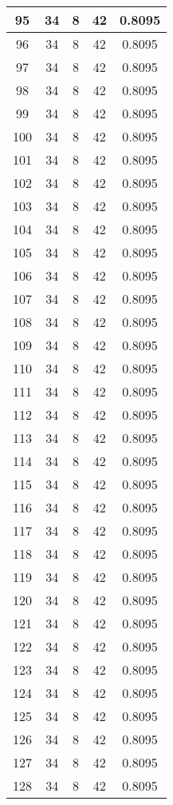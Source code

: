 \documentclass[letterpaper, 12pt]{article}
\begin{document}
\begin{longtable}{|c|c|c|c|c|}
\hline
95 & 34 & 8 & 42 & 0.8095 \\
\hline
96 & 34 & 8 & 42 & 0.8095 \\
\hline
97 & 34 & 8 & 42 & 0.8095 \\
\hline
98 & 34 & 8 & 42 & 0.8095 \\
\hline
99 & 34 & 8 & 42 & 0.8095 \\
\hline
100 & 34 & 8 & 42 & 0.8095 \\
\hline
101 & 34 & 8 & 42 & 0.8095 \\
\hline
102 & 34 & 8 & 42 & 0.8095 \\
\hline
103 & 34 & 8 & 42 & 0.8095 \\
\hline
104 & 34 & 8 & 42 & 0.8095 \\
\hline
105 & 34 & 8 & 42 & 0.8095 \\
\hline
106 & 34 & 8 & 42 & 0.8095 \\
\hline
107 & 34 & 8 & 42 & 0.8095 \\
\hline
108 & 34 & 8 & 42 & 0.8095 \\
\hline
109 & 34 & 8 & 42 & 0.8095 \\
\hline
110 & 34 & 8 & 42 & 0.8095 \\
\hline
111 & 34 & 8 & 42 & 0.8095 \\
\hline
112 & 34 & 8 & 42 & 0.8095 \\
\hline
113 & 34 & 8 & 42 & 0.8095 \\
\hline
114 & 34 & 8 & 42 & 0.8095 \\
\hline
115 & 34 & 8 & 42 & 0.8095 \\
\hline
116 & 34 & 8 & 42 & 0.8095 \\
\hline
117 & 34 & 8 & 42 & 0.8095 \\
\hline
118 & 34 & 8 & 42 & 0.8095 \\
\hline
119 & 34 & 8 & 42 & 0.8095 \\
\hline
120 & 34 & 8 & 42 & 0.8095 \\
\hline
121 & 34 & 8 & 42 & 0.8095 \\
\hline
122 & 34 & 8 & 42 & 0.8095 \\
\hline
123 & 34 & 8 & 42 & 0.8095 \\
\hline
124 & 34 & 8 & 42 & 0.8095 \\
\hline
125 & 34 & 8 & 42 & 0.8095 \\
\hline
126 & 34 & 8 & 42 & 0.8095 \\
\hline
127 & 34 & 8 & 42 & 0.8095 \\
\hline
128 & 34 & 8 & 42 & 0.8095 \\

\end{longtable}
\end{document}

